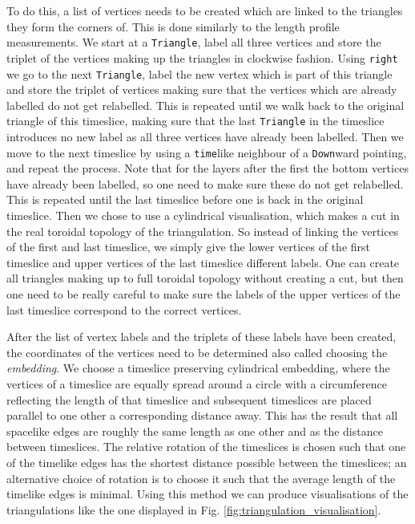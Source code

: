 To do this, a list of vertices needs to be created which are linked to the triangles they form the corners of.
This is done similarly to the length profile measurements.
We start at a \verb|Triangle|, label all three vertices and store the triplet of the vertices making up the triangles in clockwise fashion.
Using \verb|right| we go to the next \verb|Triangle|, label the new vertex which is part of this triangle and store the triplet of vertices making sure that the vertices which are already labelled do not get relabelled.
This is repeated until we walk back to the original triangle of this timeslice, making sure that the last \verb|Triangle| in the timeslice introduces no new label as all three vertices have already been labelled.
Then we move to the next timeslice by using a \verb|time|like neighbour of a \verb|Down|ward pointing, and repeat the process.
Note that for the layers after the first the bottom vertices have already been labelled, so one need to make sure these do not get relabelled.
This is repeated until the last timeslice before one is back in the original timeslice.
Then we chose to use a cylindrical visualisation, which makes a cut in the real toroidal topology of the triangulation. So instead of linking the vertices of the first and last timeslice, we simply give the lower vertices of the first timeslice and upper vertices of the last timeslice different labels.
One can create all triangles making up to full toroidal topology without creating a cut, but then one need to be really careful to make sure the labels of the upper vertices of the last timeslice correspond to the correct vertices.

After the list of vertex labels and the triplets of these labels have been created, the coordinates of the vertices need to be determined also called choosing the \emph{embedding}.
We choose a timeslice preserving cylindrical embedding, where the vertices of a timeslice are equally spread around a circle with a circumference reflecting the length of that timeslice and subsequent timeslices are placed parallel to one other a corresponding distance away.
This has the result that all spacelike edges are roughly the same length as one other and as the distance between timeslices. The relative rotation of the timeslices is chosen such that one of the timelike edges has the shortest distance possible between the timeslices; an alternative choice of rotation is to choose it such that the average length of the timelike edges is minimal.
Using this method we can produce visualisations of the triangulations like the one
displayed in Fig. \ref{fig:triangulation_visualisation}.

